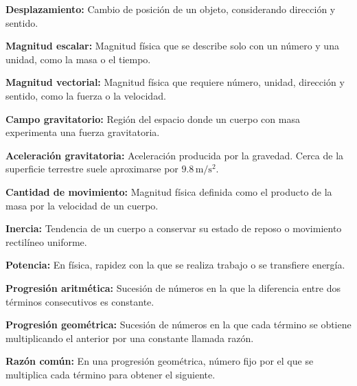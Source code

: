 \documentclass[12pt,final]{report}
\theoremstyle{plain}
\theoremstyle{definition}
\begin{document}
\textbf{Desplazamiento:} Cambio de posición de un objeto, considerando dirección y sentido.

\vspace{0.5em}

\textbf{Magnitud escalar:} Magnitud física que se describe solo con un número y una unidad, como la masa o el tiempo.

\vspace{0.5em}

\textbf{Magnitud vectorial:} Magnitud física que requiere número, unidad, dirección y sentido, como la fuerza o la velocidad.

\vspace{0.5em}

\textbf{Campo gravitatorio:} Región del espacio donde un cuerpo con masa experimenta una fuerza gravitatoria.

\vspace{0.5em}

\textbf{Aceleración gravitatoria:} Aceleración producida por la gravedad. Cerca de la superficie terrestre suele aproximarse por $9.8\,\mathrm{m/s^2}$.

\vspace{0.5em}

\textbf{Cantidad de movimiento:} Magnitud física definida como el producto de la masa por la velocidad de un cuerpo.

\vspace{0.5em}

\textbf{Inercia:} Tendencia de un cuerpo a conservar su estado de reposo o movimiento rectilíneo uniforme.

\vspace{0.5em}

\textbf{Potencia:} En física, rapidez con la que se realiza trabajo o se transfiere energía.

\vspace{0.5em}

\textbf{Progresión aritmética:} Sucesión de números en la que la diferencia entre dos términos consecutivos es constante.

\vspace{0.5em}

\textbf{Progresión geométrica:} Sucesión de números en la que cada término se obtiene multiplicando el anterior por una constante llamada razón.

\vspace{0.5em}

\textbf{Razón común:} En una progresión geométrica, número fijo por el que se multiplica cada término para obtener el siguiente.
\end{document}
